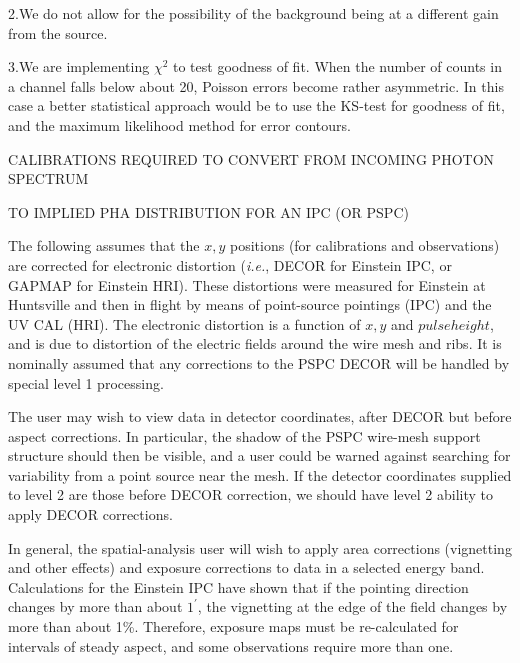 \item{2.}We do not allow for the possibility of the background being at a different
gain from the source.

\item{3.}We are implementing $\chi^2$ to test goodness of fit.
When the number of counts in a channel falls below about 20, Poisson
errors become rather asymmetric.  In this case a better statistical
approach would be to use the KS-test for goodness of fit, and the
maximum likelihood method for error contours.

\vfill\eject

\def\chapter{\it D.M. Worrall}
\def\version{\it Rev 1.0. November 20th, 1986.}


\vskip 24pt

\vskip 18pt

\centerline{CALIBRATIONS REQUIRED TO CONVERT FROM INCOMING PHOTON SPECTRUM}
\centerline{TO IMPLIED PHA DISTRIBUTION FOR AN IPC (OR PSPC)}
\vskip 18pt

\startcount

The following assumes that the $x,y$ positions (for calibrations and
observations) are corrected
for electronic distortion ({\it i.e.}, DECOR for Einstein IPC, or
GAPMAP for Einstein HRI). These distortions were measured
for Einstein at Huntsville and then in flight by means of
point-source pointings (IPC) and the UV CAL (HRI).  The electronic 
distortion is a function of $x,y$ and $pulseheight$, and is due to 
distortion of the electric fields around the wire mesh and ribs.  
It is nominally assumed that
any corrections to the PSPC DECOR will be handled by special level 1
processing.  

The user may wish to view data in detector coordinates, after DECOR but
before aspect corrections.  In particular, the shadow of the PSPC wire-mesh
support structure should then be visible, and a user could be warned against
searching for variability from a point source near the mesh.
If the detector coordinates supplied to level 2 are
those before DECOR correction, we should have level 2 ability to
apply DECOR corrections.

In general, the spatial-analysis user will wish to apply area corrections
(vignetting and other effects) and exposure corrections to data in a 
selected energy band.  Calculations for the Einstein IPC have shown
that if the pointing direction changes by more than about $1^\prime$, the
vignetting at the edge of the field changes by more than about 1\%.  Therefore,
exposure maps must be re-calculated for intervals of steady aspect, and
some observations require more than one.
 
